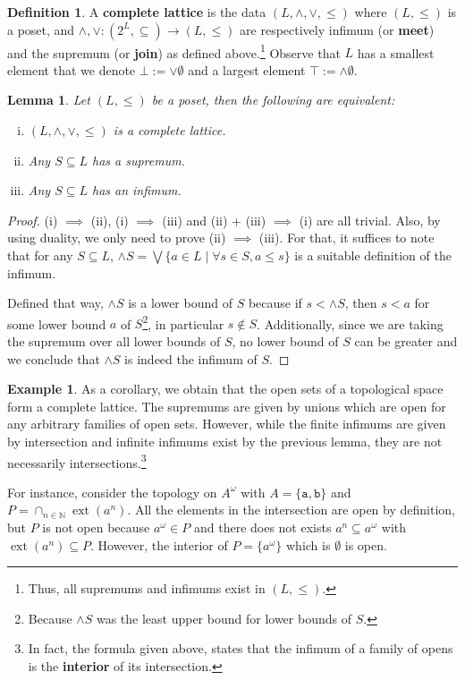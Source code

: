 \documentclass{tufte-handout} %
\newtheorem{lem}[thm]{Lemma}
\theoremstyle{definition}
\newtheorem{defn}[thm]{Definition}
\newtheorem{exmp}[thm]{Example}
\theoremstyle{remark}
\newcommand{\N}{\mathbb{N}}
\newcommand{\0}{\textsf{0}}
\newcommand{\1}{\textsf{1}}
\DeclareMathOperator{\ext}{ext}
\begin{document}
\begin{defn}
	A \textbf{complete lattice} is the data $(L, \wedge, \vee, \leq)$ where $(L, \leq)$ is a poset, and $\wedge, \vee : (2^L, \subseteq) \rightarrow (L, \leq)$ are respectively infimum (or \textbf{meet}) and the supremum (or \textbf{join}) as defined above.\footnote{Thus, all supremums and infimums exist in $(L, \leq)$.} Observe that $L$ has a smallest element that we denote $\bot := \vee \emptyset$ and a largest element $\top := \wedge \emptyset$.
\end{defn}
\begin{lem}\label{lem-posetlattice}
	Let $(L, \leq)$ be a poset, then the following are equivalent:
	\begin{enumerate}[(i)]
		\item $(L, \wedge, \vee, \leq)$ is a complete lattice.
		\item Any $S \subseteq L$ has a supremum.
		\item Any $S \subseteq L$ has an infimum.
	\end{enumerate}
\end{lem}
\begin{proof} %
	(i) $\implies$ (ii), (i) $\implies$ (iii) and (ii) + (iii) $\implies$ (i) are all trivial. Also, by using duality, we only need to prove (ii) $\implies$ (iii). For that, it suffices to note that for any $S \subseteq L$, $\wedge S = \bigvee \{a \in L \mid \forall s \in S, a \leq s\}$ is a suitable definition of the infimum.
	
	Defined that way, $\wedge S$ is a lower bound of $S$ because if $s < \wedge S$, then $s < a$ for some lower bound $a$ of $S$\footnote{Because $\wedge S$ was the least upper bound for lower bounds of $S$.}, in particular $s \notin S$. Additionally, since we are taking the supremum over all lower bounds of $S$, no lower bound of $S$ can be greater and we conclude that $\wedge S$ is indeed the infimum of $S$.
\end{proof}
\begin{exmp}
	As a corollary, we obtain that the open sets of a topological space form a complete lattice. The supremums are given by unions which are open for any arbitrary families of open sets. However, while the finite infimums are given by intersection and infinite infimums exist by the previous lemma, they are not necessarily intersections.\footnote{In fact, the formula given above, states that the infimum of a family of opens is the \textbf{interior} of its intersection.}%
	
	For instance, consider the topology on $A^{\omega}$ with $A = \{\texttt{a}, \texttt{b}\}$ and $P = \cap_{n \in \N} \ext(a^n)$. All the elements in the intersection are open by definition, but $P$ is not open because $a^{\omega} \in P$ and there does not exists $a^n\subseteq a^{\omega}$ with $\ext(a^n) \subseteq P$. However, the interior of $P = \{a^{\omega}\}$ which is $\emptyset$ is open.
\end{exmp}
\end{document}
